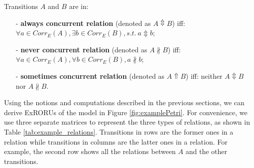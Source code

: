 \documentclass{llncs}
\begin{document}
\begin{definition}\label{def:concurrentRelations}
Transitions $A$ and $B$ are in: 
	\begin{itemize}
		\item[-] \textbf{always concurrent relation} (denoted as $A\Updownarrow B$) iff: $\forall a\in Corr_{E}(A),\exists b\in Corr_{E}(B),s.t.~a\Updownarrow b$;
		\item[-] \textbf{never concurrent relation} (denoted as $A\nparallel B$) iff: $\forall a\in Corr_{E}(A),\forall b\in Corr_{E}(B),a\nparallel b$;
		\item[-] \textbf{sometimes concurrent relation} (denoted as $A\Uparrow B$) iff: neither $A\Updownarrow B$ nor $A\nparallel B$.
	\end{itemize}
\end{definition}

Using the notions and computations described in the previous sections, we can derive ExRORUs of the model in Figure \ref{fig:examplePetri}. For convenience, we use three separate matrices to represent the three types of relations, as shown in Table \ref{tab:example_relations}. Transitions in rows are the former ones in a relation while transitions in columns are the latter ones in a relation. For example, the second row shows all the relations between $A$ and the other transitions.
\end{document}
